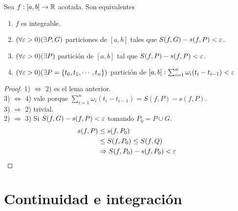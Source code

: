 \begin{theorem}
  Sea $f: [a, b] \to \mathbb{R}$ acotada. Son equivalentes \begin{enumerate}
    \item $f$ es integrable.
    \item $(\forall \varepsilon > 0)(\exists P, G)$ particiones de $[a, b]$ tales que $S(f, G) - s(f, P) < \varepsilon$.
    \item $(\forall \varepsilon > 0)(\exists P)$ partición de $[a, b]$ tal que $S(f, P) - s(f, P) < \varepsilon$.
    \item $(\forall \varepsilon > 0)(\exists P = \{ t_0, t_1, \cdots, t_n \})$ partición de $[a, b] : \sum_{i = 1}^n \omega_i (t_i - t_{i-1}) < \varepsilon$
  \end{enumerate}

  \begin{proof}
    1) $\iff$ 2) es el lema anterior. \\
    3) $\iff$ 4) vale porque $\sum_{i = 1}^n \omega_i (t_i - t_{i-1}) = S(f, P) - s(f, P)$. \\
    3) $\Rightarrow$ 2) trivial. \\
    2) $\Rightarrow$ 3) Si $S(f, G) - s(f, P) < \varepsilon$ tomando $P_0 = P \cup G$. \begin{align*}
      s(f, P) & \leq s(f, P_0) \\
      & \leq S(f, P_0) \leq S(f, Q) \\
      & \Rightarrow S(f, P_0) - s(f, P_0) < \varepsilon
    \end{align*}
  \end{proof}
\end{theorem}

\clearpage

\section{Continuidad e integración}

